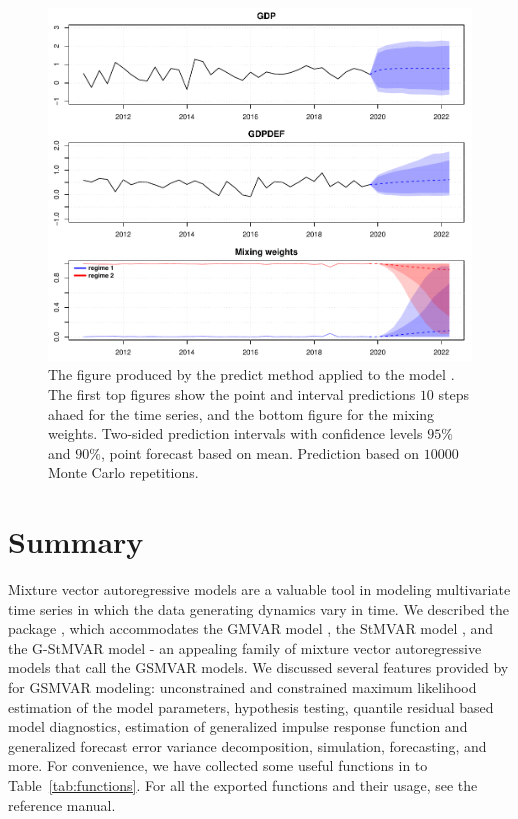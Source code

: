 \documentclass[nojss]{jss}
\begin{document}
\begin{figure}[t]
  \centering
  \includegraphics{figures/predplot.pdf}
  \caption{The figure produced by the predict method applied to the model . The first top figures show the point and interval predictions $10$ steps ahaed for the time series, and the bottom figure for the mixing weights. Two-sided prediction intervals with confidence levels $95\%$ and $90\%$, point forecast based on mean. Prediction based on $10000$ Monte Carlo repetitions.}
\label{fig:predplot}
\end{figure}


\section{Summary}\label{sec:summary}

Mixture vector autoregressive models are a valuable tool in modeling multivariate time series in which the data generating dynamics vary in time. We described the  package , which accommodates the GMVAR model \citep{Kalliovirta+Meitz+Saikkonen:2016}, the StMVAR model \citep{Virolainen2:2021}, and the G-StMVAR model \citep{Virolainen2:2021} - an appealing family of mixture vector autoregressive models that call the GSMVAR models. We discussed several features provided by  for GSMVAR modeling: unconstrained and constrained maximum likelihood estimation of the model parameters, hypothesis testing, quantile residual based model diagnostics, estimation of generalized impulse response function and generalized forecast error variance decomposition, simulation, forecasting, and more. For convenience, we have collected some useful functions in  to Table~\ref{tab:functions}. For all the exported functions and their usage, see the reference manual.
\end{document}
